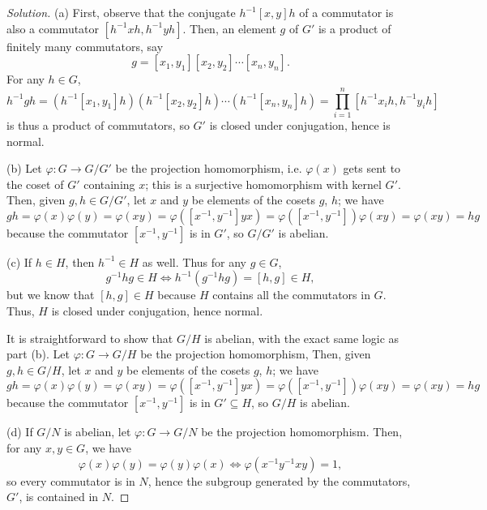 \documentclass[11pt]{scrartcl}
\providecommand{\inv}{^{-1}}
\newenvironment{soln}{\begin{proof}[Solution]}{\end{proof}}
\begin{document}
\begin{soln}
    (a) First, observe that the conjugate $h\inv[x,y]h$ of a commutator
    is also a commutator $[h\inv xh, h\inv yh]$.
    Then, an element $g$ of $G'$ is a product of finitely many commutators, say
    \begin{equation*}
	g = [x_1,y_1][x_2,y_2]\cdots[x_n,y_n].
    \end{equation*}
    For any $h\in G$,
    \begin{equation*}
	h\inv gh = (h\inv [x_1,y_1]h)(h\inv[x_2,y_2]h)\cdots(h\inv[x_n,y_n]h)
	= \prod_{i=1}^n [h\inv x_ih, h\inv y_ih]
    \end{equation*}
    is thus a product of commutators, so $G'$ is closed under conjugation,
    hence is normal.

    (b) Let $\varphi\colon G\to G/G'$ be the projection homomorphism,
    i.e. $\varphi(x)$ gets sent to the coset of $G'$ containing $x$;
    this is a surjective homomorphism with kernel $G'$.
    Then, given $g,h\in G/G'$, let $x$ and $y$ be elements of
    the cosets $g$, $h$; we have
    \begin{equation*}
        gh = \varphi(x)\varphi(y) = \varphi(xy)
	= \varphi([x\inv, y\inv]yx) = \varphi([x\inv, y\inv])\varphi(xy)
	= \varphi(xy) = hg
    \end{equation*}
    because the commutator $[x\inv, y\inv]$ is in $G'$, so $G/G'$ is abelian.

    (c) If $h\in H$, then $h\inv\in H$ as well. Thus for any $g\in G$,
    \begin{equation*}
	g\inv hg\in H \iff h\inv (g\inv hg) = [h,g]\in H,
    \end{equation*}
    but we know that $[h,g]\in H$ because $H$ contains all the commutators in $G$.
    Thus, $H$ is closed under conjugation, hence normal.

    It is straightforward to show that $G/H$ is abelian,
    with the exact same logic as part (b).
    Let $\varphi\colon G\to G/H$ be the projection homomorphism,
    Then, given $g,h\in G/H$, let $x$ and $y$ be elements of
    the cosets $g$, $h$; we have
    \begin{equation*}
        gh = \varphi(x)\varphi(y) = \varphi(xy)
	= \varphi([x\inv, y\inv]yx) = \varphi([x\inv, y\inv])\varphi(xy)
	= \varphi(xy) = hg
    \end{equation*}
    because the commutator $[x\inv, y\inv]$ is in $G'\subseteq H$,
    so $G/H$ is abelian.

    (d) If $G/N$ is abelian, let $\varphi\colon G\to G/N$ be
    the projection homomorphism. Then, for any $x,y\in G$, we have
    \begin{equation*}
        \varphi(x)\varphi(y) = \varphi(y)\varphi(x)
	\iff \varphi(x\inv y\inv xy) = 1,
    \end{equation*}
    so every commutator is in $N$, hence the subgroup generated by the commutators,
    $G'$, is contained in $N$.
\end{soln}
\end{document}
